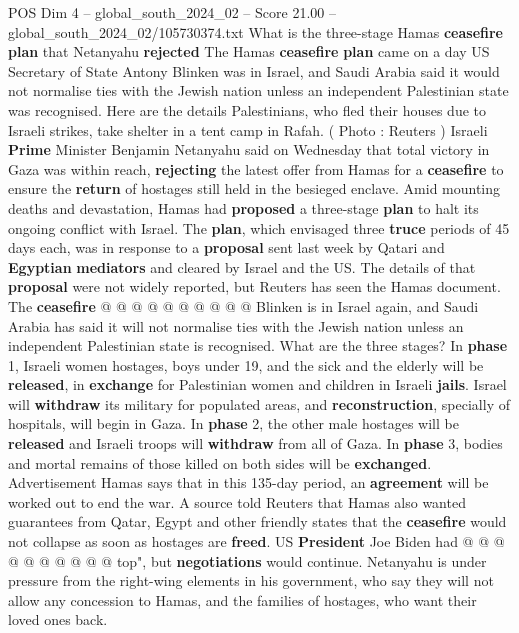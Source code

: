 \begin{textsample}{POS Dim 4 – global\_south\_2024\_02 – Score 21.00 – global\_south\_2024\_02/105730374.txt}  \label{ex:f4_pos_077}
What is the three-stage Hamas \textbf{ceasefire} \textbf{plan} that Netanyahu \textbf{rejected} The Hamas \textbf{ceasefire} \textbf{plan} came on a day US Secretary of State Antony Blinken was in Israel, and Saudi Arabia said it would not normalise ties with the Jewish nation unless an independent Palestinian state was recognised.
Here are the details Palestinians, who fled their houses due to Israeli strikes, take shelter in a tent camp in Rafah. ( Photo : Reuters ) Israeli \textbf{Prime} Minister Benjamin Netanyahu said on Wednesday that total victory in Gaza was within reach, \textbf{rejecting} the latest offer from Hamas for a \textbf{ceasefire} to ensure the \textbf{return} of hostages still held in the besieged enclave.
Amid mounting deaths and devastation, Hamas had \textbf{proposed} a three-stage \textbf{plan} to halt its ongoing conflict with Israel.
The \textbf{plan}, which envisaged three \textbf{truce} periods of 45 days each, was in response to a \textbf{proposal} sent last week by Qatari and \textbf{Egyptian} \textbf{mediators} and cleared by Israel and the US.
The details of that \textbf{proposal} were not widely reported, but Reuters has seen the Hamas document.
The \textbf{ceasefire} @ @ @ @ @ @ @ @ @ @ Blinken is in Israel again, and Saudi Arabia has said it will not normalise ties with the Jewish nation unless an independent Palestinian state is recognised.
What are the three stages?
In \textbf{phase} 1, Israeli women hostages, boys under 19, and the sick and the elderly will be \textbf{released}, in \textbf{exchange} for Palestinian women and children in Israeli \textbf{jails}.
Israel will \textbf{withdraw} its military for populated areas, and \textbf{reconstruction}, specially of hospitals, will begin in Gaza.
In \textbf{phase} 2, the other male hostages will be \textbf{released} and Israeli troops will \textbf{withdraw} from all of Gaza.
In \textbf{phase} 3, bodies and mortal remains of those killed on both sides will be \textbf{exchanged}.
Advertisement Hamas says that in this 135-day period, an \textbf{agreement} will be worked out to end the war.
A source told Reuters that Hamas also wanted guarantees from Qatar, Egypt and other friendly states that the \textbf{ceasefire} would not collapse as soon as hostages are \textbf{freed}.
US \textbf{President} Joe Biden had @ @ @ @ @ @ @ @ @ @ top", but \textbf{negotiations} would continue.
Netanyahu is under pressure from the right-wing elements in his government, who say they will not allow any concession to Hamas, and the families of hostages, who want their loved ones back.

\end{textsample}

